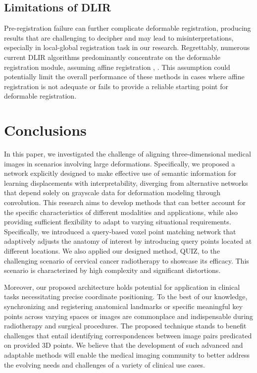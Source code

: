 \documentclass[preprint,review,12pt]{elsarticle}
\begin{document}
\subsection{Limitations of DLIR}

Pre-registration failure can further complicate deformable registration, producing results that are challenging to decipher and may lead to misinterpretations, especially in local-global registration task in our research. Regrettably, numerous current DLIR algorithms predominantly concentrate on the deformable registration module, assuming affine registration \cite{yu2022keymorph}, \cite{mok2022affine}. This assumption could potentially limit the overall performance of these methods in cases where affine registration is not adequate or fails to provide a reliable starting point for deformable registration.



\section{Conclusions}
In this paper, we investigated the challenge of aligning three-dimensional medical images in scenarios involving large deformations. Specifically, we proposed a network explicitly designed to make effective use of semantic information for learning displacements with interpretability, diverging from alternative networks that depend solely on grayscale data for deformation modeling through convolution. This research aims to develop methods that can better account for the specific characteristics of different modalities and applications, while also providing sufficient flexibility to adapt to varying situational requirements. Specifically, we introduced a query-based voxel point matching network that adaptively adjusts the anatomy of interest by introducing query points located at different locations. We also applied our designed method, QUIZ, to the challenging scenario of cervical cancer radiotherapy to showcase its efficacy. This scenario is characterized by high complexity and significant distortions. 

Moreover, our proposed architecture holds potential for application in clinical tasks necessitating precise coordinate positioning. To the best of our knowledge, synchronizing and registering anatomical landmarks or specific meaningful key points across varying spaces or images are commonplace and indispensable during radiotherapy and surgical procedures. The proposed technique stands to benefit challenges that entail identifying correspondences between image pairs predicated on provided 3D points. We believe that the development of such advanced and adaptable methods will enable the medical imaging community to better address the evolving needs and challenges of a variety of clinical use cases.
\end{document}
